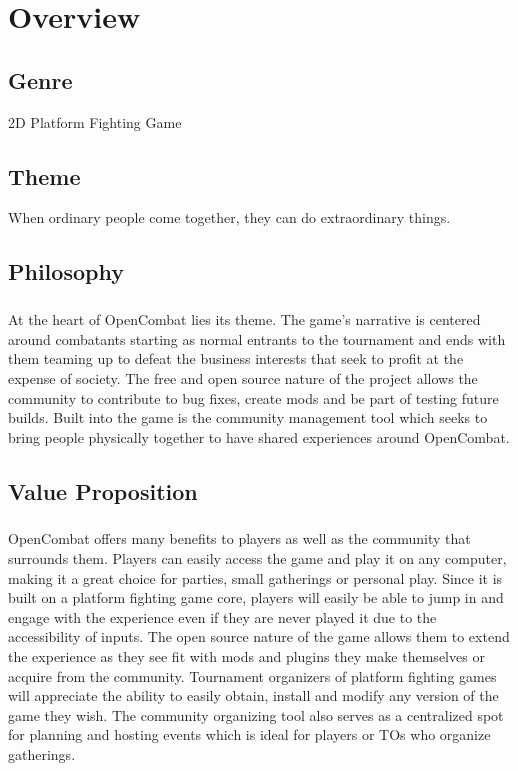 \chapter{Overview}

\section{Genre}

2D Platform Fighting Game

\section{Theme}

When ordinary people come together, they can do extraordinary things.

\section{Philosophy}

\paragraph{} At the heart of OpenCombat lies its theme. The game's narrative is centered around combatants starting as normal entrants to the tournament and ends with them teaming up to defeat the business interests that seek to profit at the expense of society. The free and open source nature of the project allows the community to contribute to bug fixes, create mods and be part of testing future builds. Built into the game is the community management tool which seeks to bring people physically together to have shared experiences around OpenCombat.

\section{Value Proposition}

\paragraph{} OpenCombat offers many benefits to players as well as the community that surrounds them. Players can easily access the game and play it on any computer, making it a great choice for parties, small gatherings or personal play. Since it is built on a platform fighting game core, players will easily be able to jump in and engage with the experience even if they are never played it due to the accessibility of inputs. The open source nature of the game allows them to extend the experience as they see fit with mods and plugins they make themselves or acquire from the community. Tournament organizers of platform fighting games will appreciate the ability to easily obtain, install and modify any version of the game they wish. The community organizing tool also serves as a centralized spot for planning and hosting events which is ideal for players or TOs who organize gatherings.

